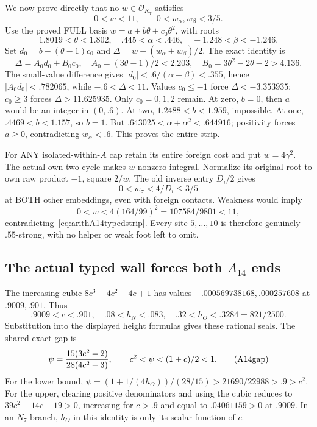\documentclass[11pt]{article}
\begin{document}
We now prove directly that no
\(w\in\mathcal O_{K_7}\) satisfies
\[
                    0<w<11,\qquad0<w_\alpha,w_\beta<3/5 .
\tag{A14strip}\label{eq:arithA14typedstrip}
\]
Use the proved FULL basis
\(w=a+b\theta+c_0\theta^2\), with roots
\[
 1.8019<\theta<1.802,\quad .445<\alpha<.446,\quad
                            -1.248<\beta<-1.246 .
\]
Set \(d_0=b-(\theta-1)c_0\) and
\(\Delta=w-(w_\alpha+w_\beta)/2\).
The exact identity is
\[
 \Delta=A_0d_0+B_0c_0,\quad
 A_0=(3\theta-1)/2<2.203,\quad
 B_0=3\theta^2-2\theta-2>4.136 .
\]
The small-value difference gives
\(|d_0|<.6/(\alpha-\beta)<.355\),
hence \(|A_0d_0|<.782065\), while
\(-.6<\Delta<11\).
Values \(c_0\le-1\) force
\(\Delta<-3.353935\);
\(c_0\ge3\) forces \(\Delta>11.625935\).
Only \(c_0=0,1,2\) remain.
At zero, \(b=0\), then \(a\) would be an
integer in \((0,.6)\).
At two, \(1.2488<b<1.959\), impossible.
At one, \(.4469<b<1.157\), so \(b=1\).
But \(.643025<\alpha+\alpha^2<.644916\);
positivity forces \(a\ge0\), contradicting
\(w_\alpha<.6\).
This proves the entire strip.

For ANY isolated-within-\(A\) cap retain
its entire foreign cost and put \(w=4\gamma^2\).
The actual own two-cycle makes \(w\)
nonzero integral.
Normalize its original root to own raw
product \(-1\), square \(2/w\).
The old inverse entry \(D_i/2\) gives
\[
                     0<w_\sigma<4/D_i\le3/5
\]
at BOTH other embeddings, even with
foreign contacts.
Weakness would imply
\[
           0<w<4(164/99)^2=107584/9801<11,
\]
contradicting~\eqref{eq:arithA14typedstrip}.
Every site \(5,\ldots,10\) is therefore
genuinely \(.55\)-strong, with no helper
or weak foot left to omit.

\subsection{The actual typed wall forces both \(A_{14}\) ends}
\label{app:arithA14typedends}

The increasing cubic \(8c^3-4c^2-4c+1\)
has values \(-.000569738168,.000257608\)
at \(.9009,.901\).
Thus
\[
 .9009<c<.901,\quad
 .08<h_N<.083,\quad .32<h_O<.3284=821/2500 .
\]
Substitution into the displayed height
formulas gives these rational seals.
The shared exact gap is
\[
 \psi={15(3c^2-2)\over28(4c^2-3)},\qquad
                         c^2<\psi<(1+c)/2<1 .
\tag{A14gap}\label{eq:arithA14typedgap}
\]
For the lower bound,
\(\psi=(1+1/(4h_O))/(28/15)>21690/22988>.9>c^2\).
For the upper, clearing positive denominators
and using the cubic reduces to
\(39c^2-14c-19>0\), increasing for \(c>.9\)
and equal to \(.04061159>0\) at \(.9009\).
In an \(N_7\) branch, \(h_O\) in this
identity is only its scalar function of \(c\).
\end{document}

